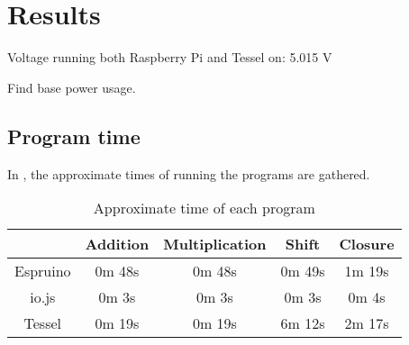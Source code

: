 \chapter{Results}
\label{ch:chapter4}

Voltage running both Raspberry Pi and Tessel on: 5.015 V

Find base power usage.

\section{Program time}
In , the approximate times of running the programs are gathered.
\begin{table}[h]
\centering
\begin{tabular}{| c | c | c | c | c |}
 \hline
 & Addition & Multiplication & Shift & Closure \\ \hline
 Espruino &  0m 48s & 0m 48s & 0m 49s & 1m 19s \\ \hline
 io.js  & 0m 3s & 0m 3s & 0m 3s & 0m 4s \\ \hline
 Tessel & 0m 19s & 0m 19s & 6m 12s & 2m 17s\\ \hline
 
\end{tabular}
\caption{Approximate time of each program}
\label{tab:timedruns}
\end{table}



 

 

 
